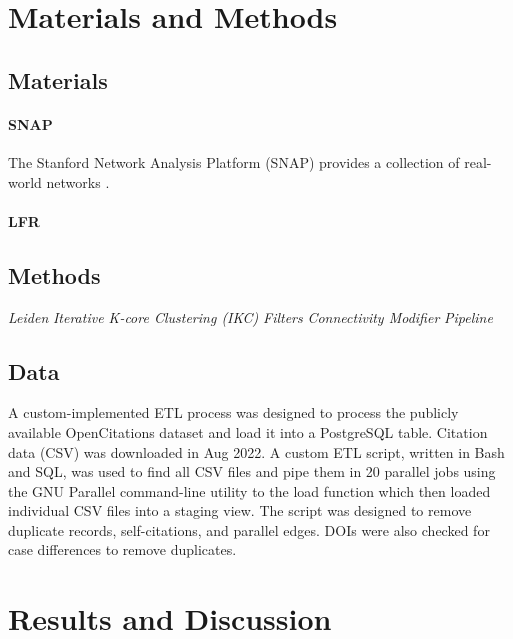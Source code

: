 \documentclass[12pt, oneside]{article}   	%
\begin{document}
\section{Materials and Methods}

\subsection{Materials}

\paragraph{SNAP}
The Stanford Network Analysis Platform (SNAP) provides a collection of real-world networks \citep{leskovec2016snap}.

\paragraph{LFR}


	
\subsection{Methods} 
\emph{Leiden}
\emph{Iterative K-core Clustering (IKC)}
\emph{Filters}
\emph{Connectivity Modifier}
\emph{Pipeline}

\subsection{Data}  A custom-implemented ETL process was designed to process the publicly available OpenCitations dataset and load it into a PostgreSQL table. Citation data (CSV) was downloaded in Aug 2022.
A custom ETL script, written in Bash and SQL, was used to find all CSV files and pipe them in 20 parallel jobs using the GNU Parallel command-line utility to the load function which then loaded individual CSV files 
into a staging view. The script was designed to remove duplicate records, self-citations, and parallel edges. DOIs were also checked for case differences to remove duplicates. 

\section{Results and Discussion}
	
\end{document}
